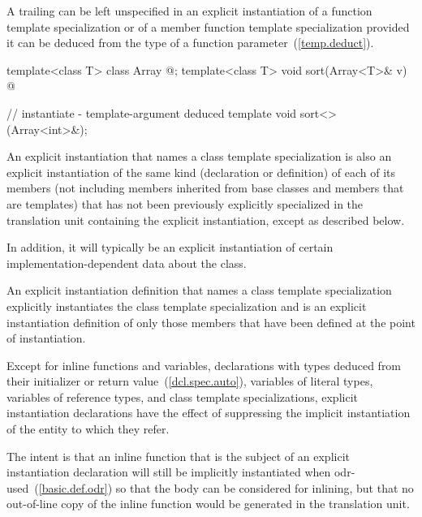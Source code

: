 \pnum
A trailing
can be left unspecified in an explicit instantiation of a function template
specialization or of a member function template specialization provided
it can be deduced from the type of a function parameter~(\ref{temp.deduct}).
\begin{example}

\begin{codeblock}
template<class T> class Array { @\commentellip@ };
template<class T> void sort(Array<T>& v) { @\commentellip@ }

// instantiate  - template-argument deduced
template void sort<>(Array<int>&);
\end{codeblock}
\end{example}

\pnum
An explicit instantiation that names a class
template specialization is also an explicit
instantiation of the same kind (declaration or definition) of each
of its members (not including members inherited from base classes and members
that are templates) that has not been previously explicitly specialized in
the translation unit containing the explicit instantiation,
except as described below.
\begin{note} In addition, it will typically be an explicit instantiation of certain
implementation-dependent data about the class. \end{note}

\pnum
An explicit instantiation definition that names a class template
specialization explicitly instantiates the class template specialization
and is an explicit instantiation definition of only those
members that have been defined at the point of instantiation.

\pnum
Except for inline functions and variables, declarations with types deduced from their
initializer or return value~(\ref{dcl.spec.auto}),  variables of
literal types,
variables of reference types, and class template specializations,
explicit instantiation declarations have the
effect of suppressing the implicit instantiation of the entity to which they
refer. \begin{note} The intent is that an inline function that is the
subject of an explicit instantiation declaration will still be implicitly
instantiated when odr-used~(\ref{basic.def.odr}) so that the body can be considered for inlining, but
that no out-of-line copy of the inline function would be generated in the
translation unit.\end{note}

